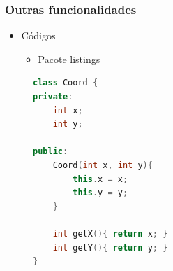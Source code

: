 \begin{frame}[fragile] \frametitle{Outras funcionalidades}
\begin{itemize}
	\item Códigos
	\begin{itemize}
		\item Pacote listings
	\end{itemize}
\end{itemize}

\begin{figure}[!h]
\begin{lstlisting}[language=C++]
class Coord {
private:
	int x;
	int y;

public:
	Coord(int x, int y){
		this.x = x;
		this.y = y;
	}

	int getX(){ return x; }
	int getY(){ return y; }
}
\end{lstlisting}
\end{figure}
\end{frame}


